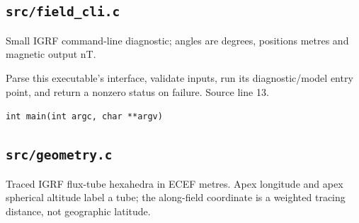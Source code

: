 \subsection{\texttt{src/field\_cli.c}}
Small IGRF command-line diagnostic; angles are degrees, positions metres and magnetic output nT.
\begin{description}[style=nextline,leftmargin=0pt,labelindent=0pt,labelwidth=0pt,labelsep=0pt]
\item[\texttt{main}] Parse this executable's interface, validate inputs, run its diagnostic/model entry point, and return a nonzero status on failure. Source line 13.\par
{\small\nolinkurl{int main(int argc, char **argv)}}
\end{description}
\subsection{\texttt{src/geometry.c}}
Traced IGRF flux-tube hexahedra in ECEF metres. Apex longitude and apex spherical altitude label a tube; the along-field coordinate is a weighted tracing distance, not geographic latitude.
